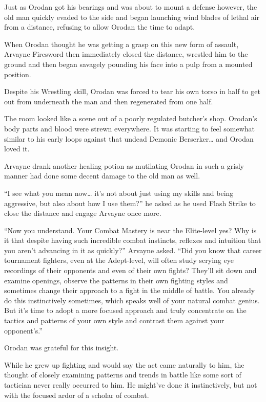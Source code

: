 \documentclass[a4paper,10pt]{book}
\begin{document}
Just as Orodan got his bearings and was about to mount a defense however, the old man quickly evaded to the side and began launching wind blades of lethal air from a distance, refusing to allow Orodan the time to adapt.\par
When Orodan thought he was getting a grasp on this new form of assault, Arvayne Firesword then immediately closed the distance, wrestled him to the ground and then began savagely pounding his face into a pulp from a mounted position.\par
Despite his Wrestling skill, Orodan was forced to tear his own torso in half to get out from underneath the man and then regenerated from one half.\par
The room looked like a scene out of a poorly regulated butcher’s shop. Orodan’s body parts and blood were strewn everywhere. It was starting to feel somewhat similar to his early loops against that undead Demonic Berserker… and Orodan loved it.\par
Arvayne drank another healing potion as mutilating Orodan in such a grisly manner had done some decent damage to the old man as well.\par
“I see what you mean now… it’s not about just using my skills and being aggressive, but also about how I use them?” he asked as he used Flash Strike to close the distance and engage Arvayne once more.\par
“Now you understand. Your Combat Mastery is near the Elite-level yes? Why is it that despite having such incredible combat instincts, reflexes and intuition that you aren’t advancing in it as quickly?” Arvayne asked. “Did you know that career tournament fighters, even at the Adept-level, will often study scrying eye recordings of their opponents and even of their own fights? They’ll sit down and examine openings, observe the patterns in their own fighting styles and sometimes change their approach to a fight in the middle of battle. You already do this instinctively sometimes, which speaks well of your natural combat genius. But it’s time to adopt a more focused approach and truly concentrate on the tactics and patterns of your own style and contrast them against your opponent’s.”\par
Orodan was grateful for this insight.\par
While he grew up fighting and would say the act came naturally to him, the thought of closely examining patterns and trends in battle like some sort of tactician never really occurred to him. He might’ve done it instinctively, but not with the focused ardor of a scholar of combat.\par
\end{document}
